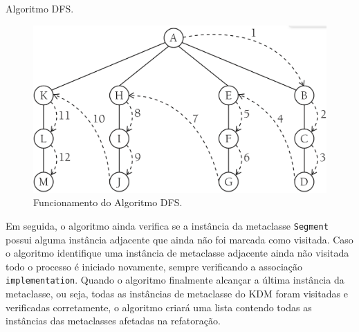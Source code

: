 \begin{algoritmo}[h]
     \SetAlgoLined
     \caption{Algoritmo DFS.}
     \label{alg:death1}
   \end{algoritmo}

\begin{figure}[h]
	\centering
	\caption{Funcionamento do Algoritmo DFS.}
	\label{fig:dfsalg}
	\includegraphics[scale=0.3]{images/algWorks2}
	\fautor
\end{figure}

Em seguida, o algoritmo ainda verifica se a instância da metaclasse \texttt{Segment} possui alguma instância adjacente que ainda não foi marcada como visitada. Caso o algoritmo identifique uma instância de metaclasse adjacente ainda não visitada todo o processo é iniciado novamente, sempre verificando a associação \texttt{implementation}. Quando o algoritmo finalmente alcançar a última instância da metaclasse, ou seja, todas as instâncias de metaclasse do KDM foram visitadas e verificadas corretamente, o algoritmo criará uma lista contendo todas as instâncias das metaclasses afetadas na refatoração. 

